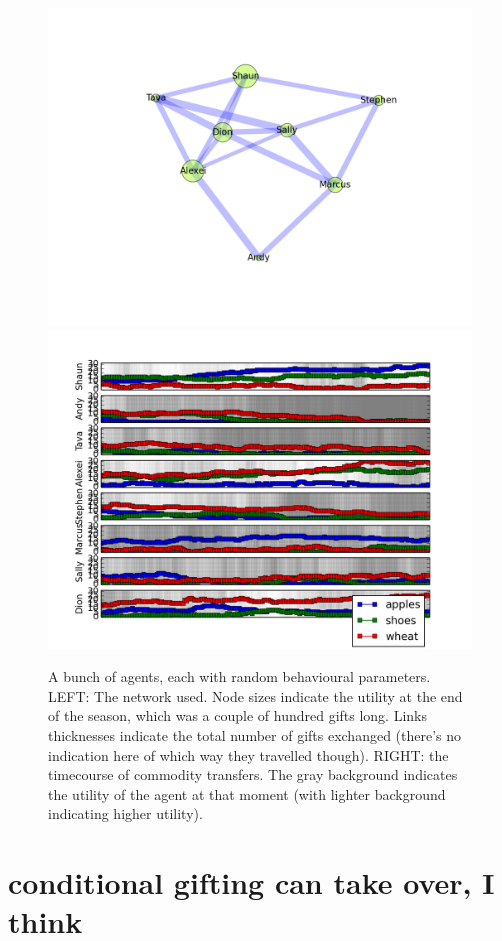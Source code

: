 \documentclass[11pt]{article}
\begin{document}
\begin{figure}[b]
\includegraphics[width=.5\textwidth]{givers_random_network_example}
\includegraphics[width=.5\textwidth]{givers_random_network_example_seq}
\caption{A bunch of agents, each with random behavioural parameters.  LEFT: The network used. Node sizes indicate the utility at the end of the season, which was a couple of hundred gifts long. Links thicknesses indicate the total number of gifts exchanged (there's no indication here of which way they travelled though). RIGHT: the timecourse of commodity transfers. The gray background indicates the utility of the agent at that moment (with lighter background indicating higher utility). }
\end{figure}

\section{conditional gifting can take over, I think}
\end{document}
